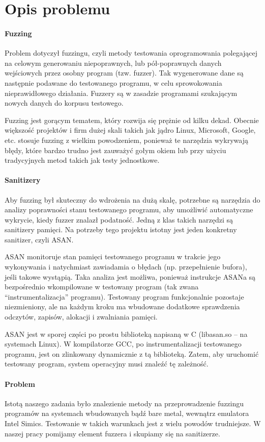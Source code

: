 \documentclass[../main.tex]{subfiles}
\begin{document}
\section{Opis problemu}
\paragraph{Fuzzing}
Problem dotyczył fuzzingu, czyli metody testowania oprogramowania polegającej
na celowym generowaniu niepoprawnych, lub pół-poprawnych danych wejściowych
przez osobny program (tzw. fuzzer). Tak wygenerowane dane są następnie podawane
do testowanego programu, w celu sprowokowania nieprawidłowego działania.
Fuzzery są w zasadzie programami szukającym nowych danych do korpusu testowego.

Fuzzing jest gorącym tematem, który rozwija się prężnie od kilku dekad. Obecnie
większość projektów i firm dużej skali takich jak jądro Linux, Microsoft,
Google, etc. stosuje  fuzzing z wielkim powodzeniem, ponieważ te narzędzia
wykrywają błędy, które bardzo trudno jest zauważyć gołym okiem lub przy użyciu
tradycyjnych metod takich jak testy jednostkowe.

\paragraph{Sanitizery}
Aby fuzzing był skuteczny do wdrożenia na dużą skalę, potrzebne są narzędzia do
analizy poprawności stanu testowanego programu, aby umożliwić automatyczne
wykrycie, kiedy fuzzer znalazł podatność. Jedną z klas takich narzędzi są
sanitizery pamięci. Na potrzeby tego projektu istotny jest jeden konkretny
sanitizer, czyli ASAN.

ASAN monitoruje stan pamięci testowanego programu w trakcie jego wykonywania i
natychmiast zawiadamia o błędach (np. przepełnienie bufora), jeśli takowe
wystąpią. Taka analiza jest możliwa, ponieważ instrukcje ASANa są bezpośrednio
wkompilowane w testowany program (tak zwana “instrumentalizacja” programu).
Testowany program funkcjonalnie pozostaje niezmieniony, ale na każdym kroku ma
wbudowane dodatkowe sprawdzenia odczytów, zapisów, alokacji i zwalniania
pamięci.

ASAN jest w sporej części po prostu biblioteką napisaną w C (libasan.so -- na
systemach Linux). W kompilatorze GCC, po instrumentalizacji testowanego
programu, jest on zlinkowany dynamicznie z tą biblioteką. Zatem, aby uruchomić
testowany program, system operacyjny musi znaleźć tę zależność.

\paragraph{Problem}
Istotą naszego zadania było znalezienie metody na przeprowadzenie fuzzingu
programów na systemach wbudowanych bądź bare metal, wewnątrz emulatora Intel
Simics. Testowanie w takich warunkach jest z wielu powodów trudniejsze. W
naszej pracy pomijamy element fuzzera i skupiamy się na sanitizerze.
\end{document}

